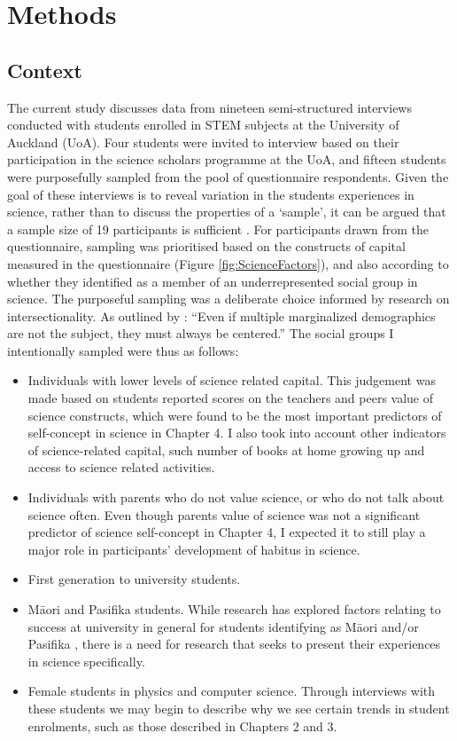 \section{Methods}

\subsection{Context}
The current study discusses data from nineteen semi-structured interviews conducted with students enrolled in STEM subjects at the University of Auckland (UoA). Four students were invited to interview based on their participation in the science scholars programme at the UoA, and fifteen students were purposefully sampled from the pool of questionnaire respondents. Given the goal of these interviews is to reveal variation in the students experiences in science, rather than to discuss the properties of a `sample', it can be argued that a sample size of 19 participants is sufficient \cite{berglund2006students}. For participants drawn from the questionnaire, sampling was prioritised based on the constructs of capital measured in the questionnaire (Figure \ref{fig:ScienceFactors}), and also according to whether they identified as a member of an underrepresented social group in science. The purposeful sampling was a deliberate choice informed by research on intersectionality. As outlined by \cite{duran2019using}: ``Even if multiple marginalized demographics are not the subject, they must always be centered.'' The social groups I intentionally sampled were thus as follows:
\begin{itemize}
    \item Individuals with lower levels of science related capital. This judgement was made based on students reported scores on the teachers and peers value of science constructs, which were found to be the most important predictors of self-concept in science in Chapter 4.  I also took into account other indicators of science-related capital, such number of books at home growing up and access to science related activities.
    \item Individuals with parents who do not value science, or who do not talk about science often. Even though parents value of science was not a significant predictor of science self-concept in Chapter 4, I expected it to still play a major role in participants' development of habitus in science. 
    \item First generation to university students. 
    \item M\={a}ori and Pasifika students. While research has explored factors relating to success at university in general for students identifying as M\={a}ori and/or Pasifika \citep{mayeda2014you}, there is a need for research that seeks to present their experiences in science specifically. 
    \item Female students in physics and computer science. Through interviews with these students we may begin to describe why we see certain trends in student enrolments, such as those described in Chapters 2 and 3.
\end{itemize}
